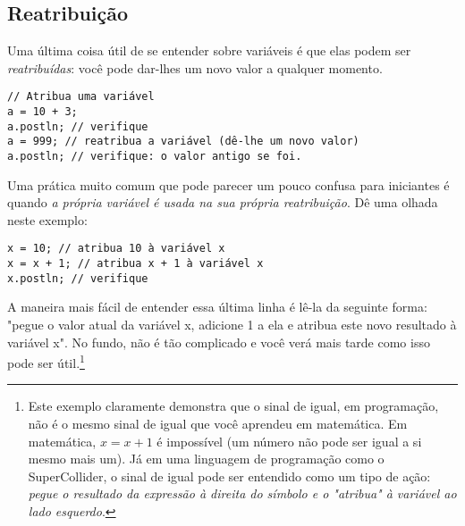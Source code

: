 \subsection{Reatribuição}

Uma última coisa útil de se entender sobre variáveis é que elas podem ser \emph{reatribuídas}: você pode dar-lhes um novo valor a qualquer momento.

\begin{lstlisting}[style=SuperCollider-IDE, basicstyle=\scttfamily\footnotesize]
// Atribua uma variável
a = 10 + 3;
a.postln; // verifique
a = 999; // reatribua a variável (dê-lhe um novo valor)
a.postln; // verifique: o valor antigo se foi.
\end{lstlisting}

Uma prática muito comum que pode parecer um pouco confusa para iniciantes é quando \emph{a própria variável é usada na sua própria reatribuição}. Dê uma olhada neste exemplo:

\begin{lstlisting}[style=SuperCollider-IDE, basicstyle=\scttfamily\footnotesize]
x = 10; // atribua 10 à variável x
x = x + 1; // atribua x + 1 à variável x
x.postln; // verifique
\end{lstlisting}

A maneira mais fácil de entender essa última linha é lê-la da seguinte forma: "pegue o valor atual da variável x, adicione 1 a ela e atribua este novo resultado à variável x". No fundo, não é tão complicado e você verá mais tarde como isso pode ser útil.\footnote{Este exemplo claramente demonstra que o sinal de igual, em programação, não é o mesmo sinal de igual que você aprendeu em matemática. Em matemática, $x = x + 1$ é impossível (um número não pode ser igual a si mesmo mais um). Já em uma linguagem de programação como o SuperCollider, o sinal de igual pode ser entendido como um tipo de ação: \emph{pegue o resultado da expressão à direita do símbolo e o "atribua" à variável ao lado esquerdo}.}

